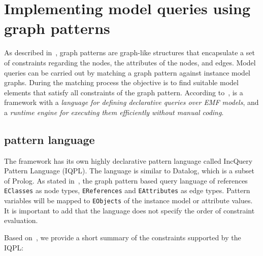 \section{Implementing model queries using graph patterns}
\label{sec:graphpatterns}


As described in~\cite{DBLP:journals/scp/UjhelyiBHHIRSV15}, graph patterns are graph-like structures that encapsulate a set of constraints regarding the nodes, the attributes of the nodes, and edges. Model queries can be carried out by matching a graph pattern against instance model graphs. During the matching process the objective is to find suitable model elements that satisfy all constraints of the graph pattern. According to~\cite{DBLP:conf/icmt/BergmannURV11}, \eiq is a framework with a \emph{language for defining declarative queries over EMF models}, and a \emph{runtime engine for executing them efficiently without manual coding}. 



\subsection{\eiq pattern language}
\label{sec:patternlanguage}
The framework has its own highly declarative pattern language called IncQuery Pattern Language (IQPL). The language is similar to Datalog, which is a subset of Prolog. As stated in~\cite{DBLP:conf/icmt/BergmannURV11}, the graph pattern based query language of \eiq references \texttt{EClasses} as node types, \texttt{EReferences} and \texttt{EAttributes} as edge types. Pattern variables will be mapped to \texttt{EObjects} of the instance model or attribute values. It is important to add that the language does not specify the order of constraint evaluation.



Based on~\cite{sosym-dslvalidation}, we provide a short summary of the constraints supported by the IQPL:

